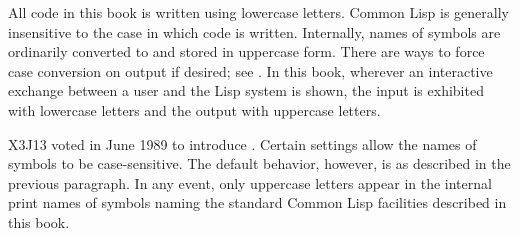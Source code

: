 \begin{obsolete}
All code in this book is written using lowercase letters.
Common Lisp is generally insensitive to the case in which code
is written.  Internally, names of symbols are ordinarily
converted to and stored in uppercase form.
There are ways to force case conversion on output if desired;
see .
In this book, wherever an interactive exchange between a user
and the Lisp system is shown, the input is exhibited with lowercase
letters and the output with uppercase letters.
\end{obsolete}

\begin{newer}
X3J13 voted in June 1989  to introduce
.  Certain settings allow the names of symbols
to be case-sensitive.  The default behavior, however, is as described
in the previous paragraph.  In any event, only uppercase letters
appear in the internal print names of symbols naming the
standard Common Lisp facilities described in this book.
\end{newer}

